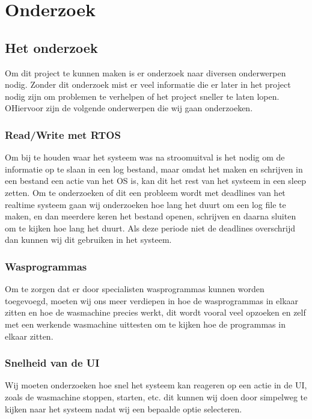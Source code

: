 \chapter{Onderzoek}
\section{Het onderzoek}
Om dit project te kunnen maken is er onderzoek naar diversen onderwerpen nodig. Zonder dit onderzoek mist er veel informatie die er later in het project nodig zijn om problemen te verhelpen of het project sneller te laten lopen.
OHiervoor zijn de volgende onderwerpen die wij gaan onderzoeken.
\subsection {Read/Write met RTOS}
Om bij te houden waar het systeem was na stroomuitval is het nodig om de informatie op te slaan in een log bestand, maar omdat het maken en schrijven in een 
bestand een actie van het OS is, kan dit het rest van het systeem in een sleep zetten. Om te onderzoeken of dit een probleem wordt met deadlines van het realtime systeem gaan wij 
onderzoeken hoe lang het duurt om een log file te maken, en dan meerdere keren het bestand openen, schrijven en daarna sluiten om te kijken hoe lang het duurt. Als deze periode niet de 
deadlines overschrijd dan kunnen wij dit gebruiken in het systeem.

\subsection{Wasprogrammas}
Om te zorgen dat er door specialisten wasprogrammas kunnen worden toegevoegd, moeten wij ons meer verdiepen in hoe de wasprogrammas in elkaar zitten en hoe de 
wasmachine precies werkt, dit wordt vooral veel opzoeken en zelf met een werkende wasmachine uittesten om te kijken hoe de programmas in elkaar zitten.

\subsection{Snelheid van de UI}
Wij moeten onderzoeken hoe snel het systeem kan reageren op een actie in de UI, zoals de wasmachine stoppen, starten, etc. dit kunnen wij doen door simpelweg te 
kijken naar het systeem nadat wij een bepaalde optie selecteren. 

